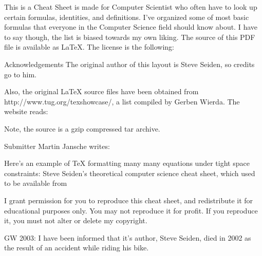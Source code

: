 
This is a Cheat Sheet is made for Computer Scientist who often have to look up certain formulas, identities, and definitions.
I've organized some of most basic formulas that everyone in the Computer Science field should know about. I have to say though, the list is biased towards my own liking.
The source of this PDF file is available as LaTeX. The license is the following:

Acknowledgements
The original author of this layout is Steve Seiden, so credits go to him.

Also, the original LaTeX source files have been obtained from http://www.tug.org/texshowcase/, a list compiled by Gerben Wierda.
The website reads:

Note, the source is a gzip compressed tar archive.

Submitter Martin Jansche writes:

Here's an example of TeX formatting many many equations under tight space constraints: Steve Seiden's theoretical computer science cheat sheet, which used to be available from

    I grant permission for you to reproduce this cheat sheet, and redistribute it for educational purposes only. You may not reproduce it for profit. If you reproduce it, you must not alter or delete my copyright.

GW 2003: I have been informed that it's author, Steve Seiden, died in 2002 as the result of an accident while riding his bike.

